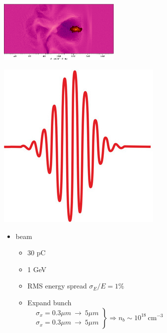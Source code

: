 \documentclass[8pt]{beamer}
\begin{document}
\begin{frame}[t]
\begin{flushright}\includegraphics[height=3cm]{frame1}\end{flushright}
\vspace{-174pt}\hspace{125pt}\includegraphics[scale=0.13]{laserpulse}\linebreak
\vfill \begin{flushright}
\begin{minipage}{0.51\textwidth}
\begin{itemize}
\item {} beam
\begin{itemize}
\item 30 pC
\item 1 GeV
\item RMS energy spread $\sigma_E/E=1\%$
\item Expand bunch \\
$\left.\begin{aligned}
&\sigma_{x}=0.3 \mu m ~\to~5\mu m\\
&\sigma_{x}=0.3 \mu m ~\to~5\mu m
\end{aligned}\right\} \Rightarrow n_b\sim10^{18}~\text{cm}^{-3}$ 
\end{itemize}
\end{itemize}
\end{minipage}
\end{flushright}


\end{frame}
\end{document}
